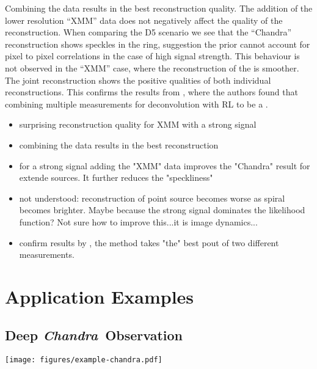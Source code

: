 \documentclass[twocolumn]{aastex631}
\newcommand{\chandra}{\textit{Chandra}~}
\newcommand{\jolideco}{\textit{Jolideco}~}
\begin{document}
    Combining the data results in the best reconstruction quality. The addition of the lower resolution \enquote{XMM} data does not negatively affect the quality of the reconstruction. When comparing the D5 scenario we see that the \enquote{Chandra} reconstruction shows speckles in the ring, suggestion the prior cannot account for pixel to pixel correlations in the case of high signal strength. This behaviour is not observed in the \enquote{XMM} case, where the reconstruction of the is smoother. The joint reconstruction shows the positive qualities of both individual reconstructions. This confirms the results from \cite{Ingaramo2014}, where the authors found that combining multiple measurements for deconvolution with RL to be a .

    \begin{itemize}
        \item surprising reconstruction quality for XMM with a strong signal
        \item combining the data results in the best reconstruction
        \item for a strong signal adding the "XMM" data improves the "Chandra" result for extende sources. It further reduces the "speckliness"
        \item not understood: reconstruction of point source becomes worse as spiral becomes brighter. Maybe because the strong signal dominates the likelihood function? Not sure how to improve this...it is image dynamics...
        \item confirm results by , the method takes "the" best pout of two different measurements. 
    \end{itemize}
    
    \section{Application Examples}
    \subsection{Deep \chandra Observation}
        
    \begin{figure*}
        \begin{centering}
            \texttt{[image: figures/example-chandra.pdf]}
            \caption{
               The \jolideco method applied to \chandra data of the SNR E0102. The left large image shows the summed counts from 25 observations. The right large image  shows the result from the \jolideco deconvolution process. The flux is given as counts relative to the reference observation with ID=1308.
               The panels \textit{Zoom A} and \textit{Zoom B} show a zoomed-in version of two example regions in the SNR, marked with the white rectangles in the large images.
            }
            \label{fig:example-chandra}
        \end{centering}
    \end{figure*}
\end{document}
